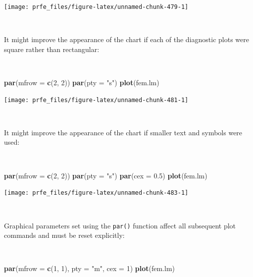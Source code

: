\documentclass[12pt,a4paper]{book}
\newenvironment{Shaded}{\begin{snugshade}}{\end{snugshade}}
\newcommand{\DataTypeTok}[1]{\textcolor[rgb]{0.13,0.29,0.53}{#1}}
\newcommand{\DecValTok}[1]{\textcolor[rgb]{0.00,0.00,0.81}{#1}}
\newcommand{\FloatTok}[1]{\textcolor[rgb]{0.00,0.00,0.81}{#1}}
\newcommand{\KeywordTok}[1]{\textcolor[rgb]{0.13,0.29,0.53}{\textbf{#1}}}
\newcommand{\NormalTok}[1]{#1}
\newcommand{\StringTok}[1]{\textcolor[rgb]{0.31,0.60,0.02}{#1}}
\theoremstyle{definition}
\theoremstyle{definition}
\theoremstyle{definition}
\theoremstyle{remark}
\begin{document}
\begin{center}\texttt{[image: prfe\_files/figure-latex/unnamed-chunk-479-1]} \end{center}

~

It might improve the appearance of the chart if each of the diagnostic
plots were square rather than rectangular:

~

\begin{Shaded}
\begin{Highlighting}[]
\KeywordTok{par}\NormalTok{(}\DataTypeTok{mfrow =} \KeywordTok{c}\NormalTok{(}\DecValTok{2}\NormalTok{, }\DecValTok{2}\NormalTok{))}
\KeywordTok{par}\NormalTok{(}\DataTypeTok{pty =} \StringTok{"s"}\NormalTok{)}
\KeywordTok{plot}\NormalTok{(fem.lm)}
\end{Highlighting}
\end{Shaded}

\newpage

\begin{center}\texttt{[image: prfe\_files/figure-latex/unnamed-chunk-481-1]} \end{center}

~

It might improve the appearance of the chart if smaller text and symbols
were used:

~

\begin{Shaded}
\begin{Highlighting}[]
\KeywordTok{par}\NormalTok{(}\DataTypeTok{mfrow =} \KeywordTok{c}\NormalTok{(}\DecValTok{2}\NormalTok{, }\DecValTok{2}\NormalTok{))}
\KeywordTok{par}\NormalTok{(}\DataTypeTok{pty =} \StringTok{"s"}\NormalTok{)}
\KeywordTok{par}\NormalTok{(}\DataTypeTok{cex =} \FloatTok{0.5}\NormalTok{)}
\KeywordTok{plot}\NormalTok{(fem.lm)}
\end{Highlighting}
\end{Shaded}

\newpage

\begin{center}\texttt{[image: prfe\_files/figure-latex/unnamed-chunk-483-1]} \end{center}

~

Graphical parameters set using the \texttt{par()} function affect all
subsequent plot commands and must be reset explicitly:

~

\begin{Shaded}
\begin{Highlighting}[]
\KeywordTok{par}\NormalTok{(}\DataTypeTok{mfrow =} \KeywordTok{c}\NormalTok{(}\DecValTok{1}\NormalTok{, }\DecValTok{1}\NormalTok{), }\DataTypeTok{pty =} \StringTok{"m"}\NormalTok{, }\DataTypeTok{cex =} \DecValTok{1}\NormalTok{)}
\KeywordTok{plot}\NormalTok{(fem.lm)}
\end{Highlighting}
\end{Shaded}
\end{document}
